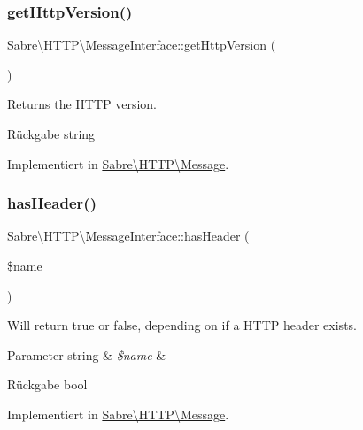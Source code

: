 \subsubsection{\texorpdfstring{get\+Http\+Version()}{getHttpVersion()}}
{\footnotesize\ttfamily Sabre\textbackslash{}\+H\+T\+T\+P\textbackslash{}\+Message\+Interface\+::get\+Http\+Version (\begin{DoxyParamCaption}{ }\end{DoxyParamCaption})}

Returns the H\+T\+TP version.

\begin{DoxyReturn}{Rückgabe}
string 
\end{DoxyReturn}


Implementiert in \mbox{\hyperlink{class_sabre_1_1_h_t_t_p_1_1_message_a690263e84e9503548b5ed73e0518433a}{Sabre\textbackslash{}\+H\+T\+T\+P\textbackslash{}\+Message}}.

\mbox{\label{interface_sabre_1_1_h_t_t_p_1_1_message_interface_ac2cb6b88f6fc6cf05a2d751dc555ec0d}} 
\subsubsection{\texorpdfstring{has\+Header()}{hasHeader()}}
{\footnotesize\ttfamily Sabre\textbackslash{}\+H\+T\+T\+P\textbackslash{}\+Message\+Interface\+::has\+Header (\begin{DoxyParamCaption}\item[{}]{\$name }\end{DoxyParamCaption})}

Will return true or false, depending on if a H\+T\+TP header exists.


\begin{DoxyParams}[1]{Parameter}
string & {\em \$name} & \\
\hline
\end{DoxyParams}
\begin{DoxyReturn}{Rückgabe}
bool 
\end{DoxyReturn}


Implementiert in \mbox{\hyperlink{class_sabre_1_1_h_t_t_p_1_1_message_abcaf141342d71f887630dac0a6eca95a}{Sabre\textbackslash{}\+H\+T\+T\+P\textbackslash{}\+Message}}.

